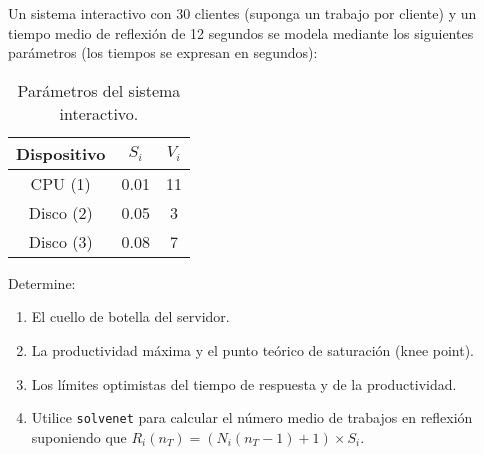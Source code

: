 \begin{ejercicio}\label{ej:5.17}
    Un sistema interactivo con 30 clientes (suponga un trabajo por cliente) y un tiempo medio de reflexión de 12 segundos se modela mediante los siguientes parámetros (los tiempos se expresan en segundos):
    \begin{table}[h]
        \centering
        \begin{tabular}{|c|c|c|}
            \hline
            Dispositivo & $S_i$ & $V_i$ \\
            \hline
            CPU (1) & 0.01 & 11 \\
            Disco (2) & 0.05 & 3 \\
            Disco (3) & 0.08 & 7 \\
            \hline
        \end{tabular}
        \caption{Parámetros del sistema interactivo.}
        \label{tab:5.17}
    \end{table}
    Determine:
    \begin{enumerate}
        \item El cuello de botella del servidor.
        \item La productividad máxima y el punto teórico de saturación (knee point).
        \item Los límites optimistas del tiempo de respuesta y de la productividad.
        \item Utilice \verb|solvenet| para calcular el número medio de trabajos en reflexión suponiendo que $R_i(n_T) = (N_i(n_T - 1) + 1) \times S_i$.
    \end{enumerate}
\end{ejercicio}
\begin{comment}
\solucion
    \begin{enumerate}
        \item El cuello de botella es el segundo disco (dispositivo número 3).
        \item La productividad máxima es $1.79$ peticiones/s y $N_T^* = 23$ clientes.
        \item Los límites son $R_0 \geq \max\{0.82, 0.56 \times N_T - 12\}$ y $X_0 \leq \min\{N_T/12.82, 1.79\}$.
        \item $20.98$ trabajos.
    \end{enumerate}
\end{comment}

